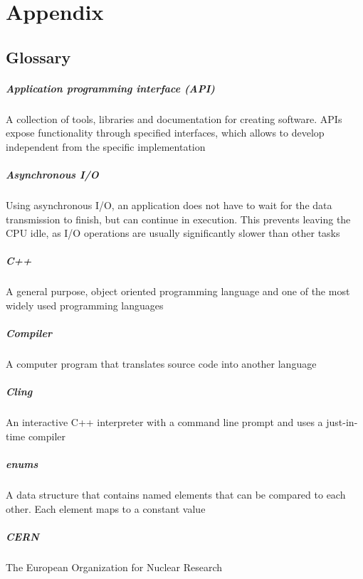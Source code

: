 \chapter{Appendix}
\section{Glossary}
\paragraph{Application programming interface (API)}
A collection of tools, libraries and documentation for creating software. APIs expose functionality through specified interfaces, which allows to develop independent from the specific implementation

\paragraph{Asynchronous I/O}

Using asynchronous I/O, an application does not have to wait for the data transmission to finish, but can continue in execution. This prevents leaving the CPU idle, as I/O operations are usually significantly slower than other tasks

\paragraph{C++}
A general purpose, object oriented programming language and one of the most widely used programming languages

\paragraph{Compiler}
A computer program that translates source code into another language
\paragraph{Cling}
An interactive C++ interpreter with a command line prompt and uses a just-in-time compiler

\paragraph{enums}
A data structure that contains named elements that can be compared to each other. Each element maps to a constant value

\paragraph{CERN}
The European Organization for Nuclear Research

